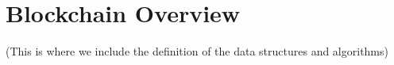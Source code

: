 \section{Blockchain Overview}

(This is where we include the definition of the data structures and algorithms)